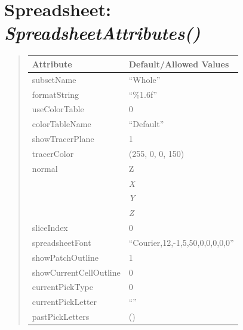 \documentclass[letterpaper,10pt,english]{sphinxmanual}
\begin{document}
\section{\textbf{Spreadsheet}: \emph{SpreadsheetAttributes()}}
\label{attributes:spreadsheet-spreadsheetattributes}
\begin{DUlineblock}{0em}
\item[] 
\end{DUlineblock}
\begin{quote}

\begin{tabulary}{\linewidth}{|L|L|}
\hline

\textbf{Attribute}
 & 
\textbf{Default/Allowed Values}
\\
\hline
subsetName
 & 
``Whole''
\\
\hline
formatString
 & 
``\%1.6f''
\\
\hline
useColorTable
 & 
0
\\
\hline
colorTableName
 & 
``Default''
\\
\hline
showTracerPlane
 & 
1
\\
\hline
tracerColor
 & 
(255, 0, 0, 150)
\\
\hline
normal
 & 
Z
\\
\hline & 
\emph{X}
\\
\hline & 
\emph{Y}
\\
\hline & 
\emph{Z}
\\
\hline
sliceIndex
 & 
0
\\
\hline
spreadsheetFont
 & 
``Courier,12,-1,5,50,0,0,0,0,0''
\\
\hline
showPatchOutline
 & 
1
\\
\hline
showCurrentCellOutline
 & 
0
\\
\hline
currentPickType
 & 
0
\\
\hline
currentPickLetter
 & 
``''
\\
\hline
pastPickLetters
 & 
()
\\
\hline\end{tabulary}

\end{quote}

\begin{DUlineblock}{0em}
\item[] 
\end{DUlineblock}

\begin{DUlineblock}{0em}
\item[] 
\end{DUlineblock}
\end{document}
